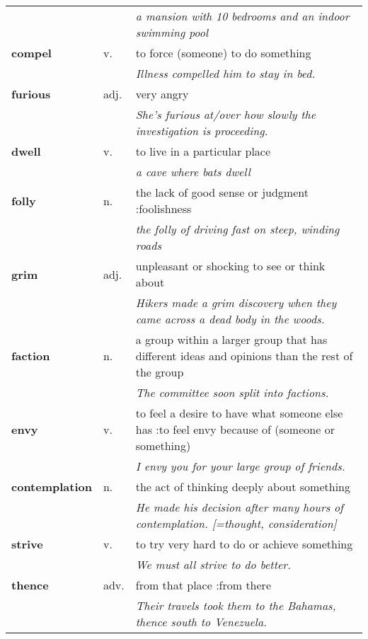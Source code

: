 \documentclass[a4paper]{article}
\begin{document}
\begin{longtable}{llp{11cm}}
 & & \textit{a mansion with 10 bedrooms and an indoor swimming pool}\\[0.08cm]
\textbf{compel} & v. &  to force (someone) to do something \\
 & & \textit{Illness compelled him to stay in bed.}\\[0.08cm]
\textbf{furious} & adj. &  very angry \\
 & & \textit{She's furious at/over how slowly the investigation is proceeding.}\\[0.08cm]
\textbf{dwell} & v. &  to live in a particular place \\
 & & \textit{a cave where bats dwell}\\[0.08cm]
\textbf{folly} & n. &  the lack of good sense or judgment :foolishness \\
 & & \textit{the folly of driving fast on steep, winding roads}\\[0.08cm]
\textbf{grim} & adj. &  unpleasant or shocking to see or think about \\
 & & \textit{Hikers made a grim discovery when they came across a dead body in the woods.}\\[0.08cm]
\textbf{faction} & n. &  a group within a larger group that has different ideas and opinions than the rest of the group \\
 & & \textit{The committee soon split into factions.}\\[0.08cm]
\textbf{envy} & v. &  to feel a desire to have what someone else has :to feel envy because of (someone or something) \\
 & & \textit{I envy you for your large group of friends.}\\[0.08cm]
\textbf{contemplation} & n. &  the act of thinking deeply about something \\
 & & \textit{He made his decision after many hours of contemplation. [=thought, consideration]}\\[0.08cm]
\textbf{strive} & v. &  to try very hard to do or achieve something \\
 & & \textit{We must all strive to do better.}\\[0.08cm]
\textbf{thence} & adv. &  from that place :from there \\
 & & \textit{Their travels took them to the Bahamas, thence south to Venezuela.}\\[0.08cm]
\end{longtable}
\end{document}
